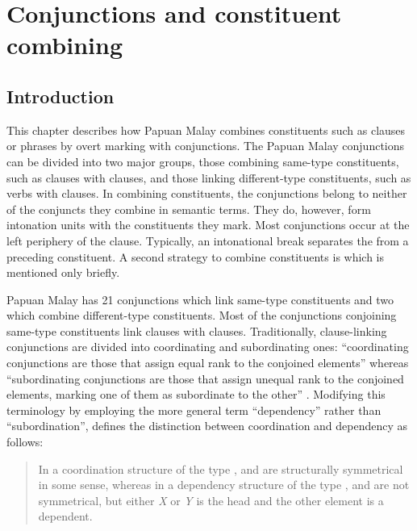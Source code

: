 \chapter[Conjunctions and constituent combining]{Conjunctions and constituent combining}
\label{Para_14}
\section{Introduction}
\label{Para_14.1}

This chapter describes how Papuan Malay combines constituents such as clauses or phrases by overt marking with conjunctions. The Papuan Malay conjunctions can be divided into two major groups, those combining same-type constituents, such as clauses with clauses, and those linking different-type constituents, such as verbs with clauses. In combining constituents, the conjunctions belong to neither of the conjuncts they combine in semantic terms. They do, however, form intonation units with the constituents they mark. Most conjunctions occur at the left periphery of the clause. Typically, an intonational break separates the  from a preceding constituent. A second strategy to combine constituents is  which is mentioned only briefly.

Papuan Malay has 21 conjunctions which link same-type constituents and two which combine different-type constituents. Most of the conjunctions conjoining same-type constituents link clauses with clauses. Traditionally, clause-linking conjunctions are divided into coordinating and subordinating ones: “coordinating conjunctions are those that assign equal rank to the conjoined elements” whereas “subordinating conjunctions are those that assign unequal rank to the conjoined elements, marking one of them as subordinate to the other” \citep[45]{Schachter.2007}. Modifying this terminology by employing the more general term “dependency” rather than “subordination”, \citet[46]{Haspelmath.2007c} defines the distinction between coordination and dependency as follows:

\begin{quote}
In a coordination structure of the type , \textit{ }and \textit{ }are structurally symmetrical in some sense, whereas in a dependency structure of the type , \textit{ }and \textit{ }are not symmetrical, but either \textit{X }or \textit{Y }is the head and the other element is a dependent.
\end{quote}

